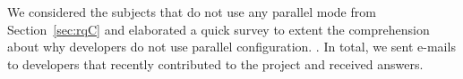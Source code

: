 We considered the \numNonParallel{} subjects that do not use any
parallel mode from Section~\ref{sec:rqC} and elaborated a
quick survey to extent the comprehension about why developers do not
use parallel configuration. .
In total, we sent \emailsSent{} e-mails to developers that recently
contributed to the project and received \emailsAnswered{} answers.

\begin{center}
\end{center}


